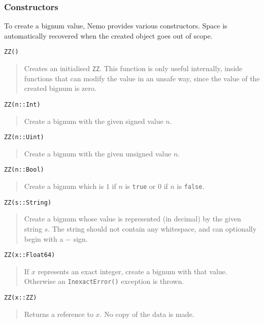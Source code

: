 \documentclass[a4paper,10pt]{article}
\newcommand{\code}{\lstinline}
\newcommand{\desc}[1]{\vspace{-3mm}\begin{quote}#1\end{quote}}
\begin{document}
{\subsubsection{Constructors}

To create a bignum value, Nemo provides various constructors. Space is automatically
recovered when the created object goes out of scope.

\begin{lstlisting}
ZZ()
\end{lstlisting}

\desc{Creates an initialised \code{ZZ}. This function is only useful internally, 
inside functions that can modify the value in an unsafe way, since the value of the
created bignum is zero.}

\begin{lstlisting}
ZZ(n::Int)
\end{lstlisting}

\desc{Create a bignum with the given signed value $n$.}

\begin{lstlisting}
ZZ(n::Uint)
\end{lstlisting}

\desc{Create a bignum with the given unsigned value $n$.}

\begin{lstlisting}
ZZ(n::Bool)
\end{lstlisting}

\desc{Create a bignum which is $1$ if $n$ is \code{true} or $0$ if $n$ is 
\code{false}.}

\begin{lstlisting}
ZZ(s::String)
\end{lstlisting}

\desc{Create a bignum whose value is represented (in decimal) by the given string
$s$. The string should not contain any whitespace, and can optionally begin with
a $-$ sign.}

\begin{lstlisting}
ZZ(x::Float64)
\end{lstlisting}

\desc{If $x$ represents an exact integer, create a bignum with that value. Otherwise
an \code{InexactError()} exception is thrown.}

\begin{lstlisting}
ZZ(x::ZZ)
\end{lstlisting}

\desc{Returns a reference to $x$. No copy of the data is made.}

}
\end{document}
